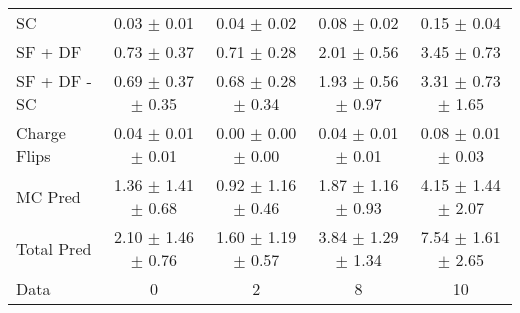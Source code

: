 \begin{tabular}{l|cccc}
                                 SC &  0.03 $\pm$  0.01 &  0.04 $\pm$  0.02 &  0.08 $\pm$  0.02 &  0.15 $\pm$  0.04 \\
                            SF + DF &  0.73 $\pm$  0.37 &  0.71 $\pm$  0.28 &  2.01 $\pm$  0.56 &  3.45 $\pm$  0.73 \\
\hline
                       SF + DF - SC &  0.69 $\pm$  0.37 $\pm$  0.35 &  0.68 $\pm$  0.28 $\pm$  0.34 &  1.93 $\pm$  0.56 $\pm$  0.97 &  3.31 $\pm$  0.73 $\pm$  1.65 \\
\hline\hline
                       Charge Flips &  0.04 $\pm$  0.01 $\pm$  0.01 &  0.00 $\pm$  0.00 $\pm$  0.00 &  0.04 $\pm$  0.01 $\pm$  0.01 &  0.08 $\pm$  0.01 $\pm$  0.03 \\
\hline
                            MC Pred &  1.36 $\pm$  1.41 $\pm$  0.68 &  0.92 $\pm$  1.16 $\pm$  0.46 &  1.87 $\pm$  1.16 $\pm$  0.93 &  4.15 $\pm$  1.44 $\pm$  2.07 \\
\hline
                         Total Pred &  2.10 $\pm$  1.46 $\pm$  0.76 &  1.60 $\pm$  1.19 $\pm$  0.57 &  3.84 $\pm$  1.29 $\pm$  1.34 &  7.54 $\pm$  1.61 $\pm$  2.65 \\
\hline\hline
                               Data &     0 &     2 &     8 &    10 \\
\hline\hline
\end{tabular}

